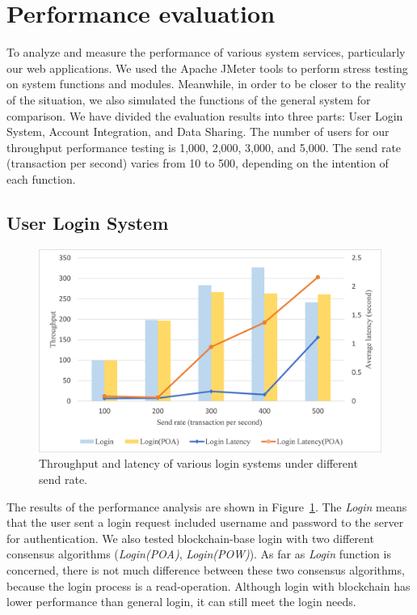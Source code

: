 \section{Performance evaluation}
To analyze and measure the performance of various system services, particularly our web applications. We used the Apache JMeter tools to perform stress testing on system functions and modules. Meanwhile, in order to be closer to the reality of the situation, we also simulated the functions of the general system for comparison. We have divided the evaluation results into three parts: User Login System, Account Integration, and Data Sharing. The number of users for our throughput performance testing is 1,000, 2,000, 3,000, and 5,000. The send rate (transaction per second) varies from 10 to 500, depending on the intention of each function.


\subsection*{User Login System}
\begin{figure}[htb]
    \centering
    \includegraphics[height=!,width=1\linewidth,keepaspectratio=true]{figures/login-throughput-latency.png}
    \caption{{\footnotesize Throughput and latency of various login systems under different send rate.}}
    \label{fig:loginThroughput}
\end{figure}
The results of the performance analysis are shown in Figure~\ref{fig:loginThroughput}. The \textit{Login} means that the user sent a login request included username and password to the server for authentication. We also tested blockchain-base login with two different consensus algorithms (\textit{Login(POA)}, \textit{Login(POW)}). As far as \textit{Login} function is concerned, there is not much difference between these two consensus algorithms, because the login process is a read-operation. Although login with blockchain has lower performance than general login, it can still meet the login needs.
\newpage

